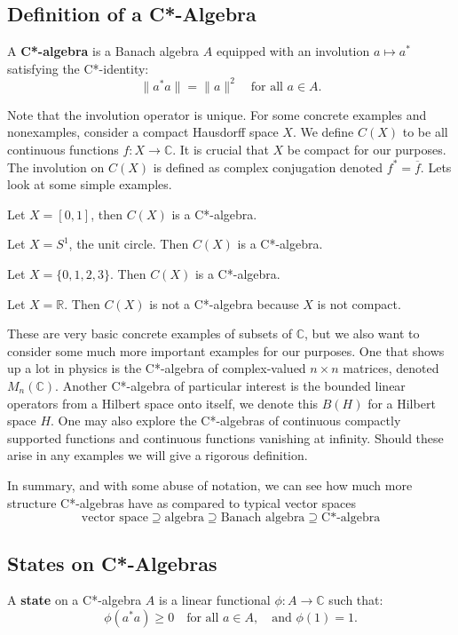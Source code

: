 \subsection{Definition of a C*-Algebra}
\begin{definition}
A \textbf{C*-algebra} is a Banach algebra \( A \) equipped with an involution \( a \mapsto a^* \) satisfying the C*-identity:
\[
\|a^*a\| = \|a\|^2 \quad \text{for all } a \in A.
\]
\end{definition}
Note that the involution operator is unique. For some concrete examples and nonexamples, consider a compact Hausdorff space $X$.
We define $C(X)$ to be all continuous functions $f: X \to \mathbb{C}$. It is crucial
that $X$ be compact for our purposes. The involution on $C(X)$ is defined as complex
conjugation denoted $f^* = \overline{f}$. Lets look at some simple examples.
\begin{example}
    Let $X = [0,1]$, then $C(X)$ is a C*-algebra.
\end{example}

\begin{example}
    Let $X = S^1$, the unit circle. Then $C(X)$ is a C*-algebra.
\end{example}

\begin{example}
    Let $X = \{ 0, 1, 2, 3\}$. Then $C(X)$ is a C*-algebra.
\end{example}

\begin{example}
    Let $X = \mathbb{R}$. Then $C(X)$ is not a C*-algebra because $X$ is not compact.
\end{example}

These are very basic concrete examples of subsets of $\mathbb{C}$, but we also want
to consider some much more important examples for our purposes. One that shows up a
lot in physics is the C*-algebra of complex-valued $n \times n$ matrices, denoted $M_n(\mathbb{C})$.
Another C*-algebra of particular interest is the bounded linear operators from a Hilbert
space onto itself, we denote this $B(H)$ for a Hilbert space $H$. One may also explore
the C*-algebras of continuous compactly supported functions and continuous functions
vanishing at infinity. Should these arise in any examples we will give a rigorous
definition.

\par

In summary, and with some abuse of notation, we can see how much more structure
C*-algebras have as compared to typical vector spaces
\begin{equation*}
    \text{vector space} \supseteq \text{algebra} \supseteq \text{Banach algebra} \supseteq \text{C*-algebra}
\end{equation*}

\subsection{States on C*-Algebras}
\begin{definition}
A \textbf{state} on a C*-algebra \( A \) is a linear functional \( \phi: A \to \mathbb{C} \) such that:
\[
\phi(a^*a) \geq 0 \quad \text{for all } a \in A, \quad \text{and } \phi(1) = 1.
\]
\end{definition}
